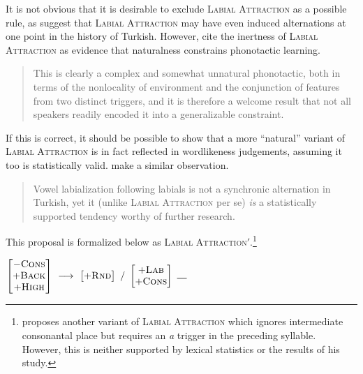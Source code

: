 It is not obvious that it is desirable to exclude \textsc{Labial Attraction} as a possible rule, as \citet[394, fn. 2]{Inkelas1997} suggest that \textsc{Labial Attraction} may have even induced alternations at one point in the history of Turkish. 
However, \citeauthor{Becker2011} cite the inertness of \textsc{Labial Attraction} as evidence that naturalness constrains phonotactic learning.

\begin{quote}
This is clearly a complex and somewhat unnatural phonotactic, both in terms of the nonlocality of environment and the conjunction of features from two distinct triggers, and it is therefore a welcome result that not all speakers readily encoded it into a generalizable constraint. \citep[118]{Becker2011}
\end{quote}

If this is correct, it should be possible to show that a more ``natural'' variant of \textsc{Labial Attraction} is in fact reflected in wordlikeness judgements, assuming it too is statistically valid.
\citeauthor{Inkelas2001} make a similar observation.

\begin{quote}
Vowel labialization following labials is not a synchronic alternation in Turkish, yet it (unlike \textsc{Labial Attraction} per se) \emph{is} a statistically supported tendency worthy of further research. \citep[196]{Inkelas2001}
\end{quote}

\noindent
This proposal is formalized below as \textsc{Labial Attraction}$'$.\footnote{
    \citet{Zimmer1969} proposes another variant of \textsc{Labial Attraction} which ignores intermediate consonantal place but requires an \emph{a} trigger in the preceding syllable. 
    However, this is neither supported by lexical statistics or the results of his study.}

\begin{shortexample}
$\begin{bmatrix} -\textsc{Cons} \\ +\textsc{Back} \\ +\textsc{High} \end{bmatrix}~\goesto~\begin{bmatrix} +\textsc{Rnd} \end{bmatrix}~/~\begin{bmatrix} +\textsc{Lab} \\ +\textsc{Cons} \end{bmatrix}~\gap{}$
\end{shortexample}

